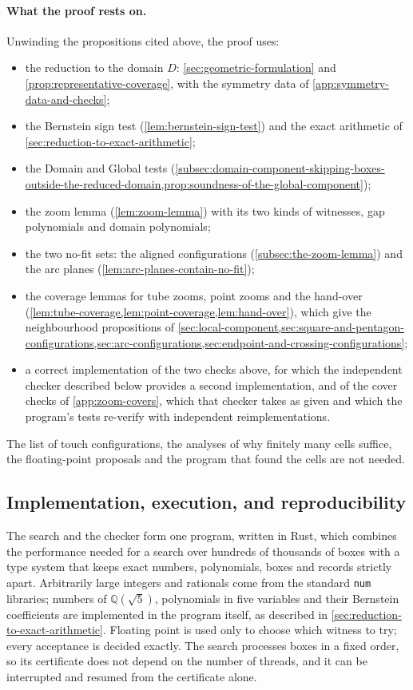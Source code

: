 \paragraph{What the proof rests on.}
Unwinding the propositions cited above, the proof uses:
\begin{itemize}
  \item the reduction to the domain $D$: \cref{sec:geometric-formulation}
    and \cref{prop:representative-coverage}, with the symmetry data of
    \cref{app:symmetry-data-and-checks};
  \item the Bernstein sign test (\cref{lem:bernstein-sign-test}) and the
    exact arithmetic of \cref{sec:reduction-to-exact-arithmetic};
  \item the Domain and Global tests
    (\cref{subsec:domain-component-skipping-boxes-outside-the-reduced-domain,prop:soundness-of-the-global-component});
  \item the zoom lemma (\cref{lem:zoom-lemma}) with its two kinds of
    witnesses, gap polynomials and domain polynomials;
  \item the two no-fit sets: the aligned configurations
    (\cref{subsec:the-zoom-lemma}) and the arc planes
    (\cref{lem:arc-planes-contain-no-fit});
  \item the coverage lemmas for tube zooms, point zooms and the hand-over
    (\cref{lem:tube-coverage,lem:point-coverage,lem:hand-over}), which give
    the neighbourhood propositions of
    \cref{sec:local-component,sec:square-and-pentagon-configurations,sec:arc-configurations,sec:endpoint-and-crossing-configurations};
  \item a correct implementation of the two checks above, for which the
    independent checker described below provides a second implementation,
    and of the cover checks of \cref{app:zoom-covers}, which that checker
    takes as given and which the program's tests re-verify with independent
    reimplementations.
\end{itemize}
The list of touch configurations, the analyses of why finitely many cells
suffice, the floating-point proposals and the program that found the cells
are not needed.

\subsection{Implementation, execution, and reproducibility}\label{subsec:implementation-execution-and-reproducibility}

The search and the checker form one program, written in Rust, which
combines the performance needed for a search over hundreds of thousands of
boxes with a type system that keeps exact numbers, polynomials, boxes and
records strictly apart. Arbitrarily large integers and rationals come from
the standard \texttt{num} libraries; numbers of $\mathbb Q(\sqrt5)$,
polynomials in five variables and their Bernstein coefficients are
implemented in the program itself, as described in
\cref{sec:reduction-to-exact-arithmetic}. Floating point is used only to
choose which witness to try; every acceptance is decided exactly. The
search processes boxes in a fixed order, so its certificate does not depend
on the number of threads, and it can be interrupted and resumed from the
certificate alone.

